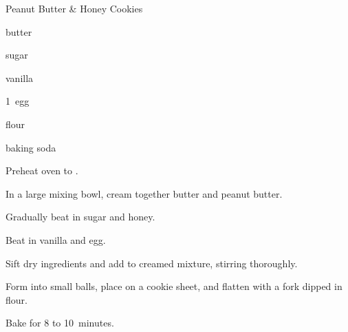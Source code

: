 \begin{recipe}{Peanut Butter \& Honey Cookies}{}{}

\begin{ingredients}
\item \C{\half} butter
\item \C{\third} 
\item \C{\half} sugar
\item \C{\third} 
\item {} vanilla
\item 1~egg
\item \C{1 \half} flour
\item {} baking soda
\end{ingredients}

\begin{directions}
\item Preheat oven to .
\item In a large mixing bowl, cream together butter and peanut butter.
\item Gradually beat in sugar and honey.
\item Beat in vanilla and egg.
\item Sift dry ingredients and add to creamed mixture, stirring thoroughly.
\item Form into small balls, place on a cookie sheet, and flatten with a fork dipped in flour.
\item Bake for 8 to 10~minutes.
\end{directions}
\end{recipe}
